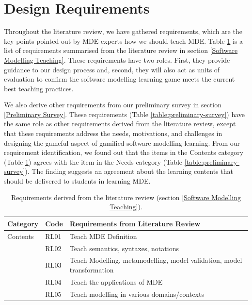 \documentclass[12pt, a4paper]{report}
\begin{document}
{\section{Design Requirements}
Throughout the literature review, we have gathered requirements, which are the key points pointed out by MDE experts how we should teach MDE. Table \ref{table:requirements} is a list of requirements summarised from the literature review in section \ref{Software Modelling Teaching}. These requirements have two roles. First, they provide guidance to our design process and, second, they will also act as units of evaluation to confirm the software modelling learning game meets the current best teaching practices. 
 
We also derive other requirements from our preliminary survey in section \ref{Preliminary Survey}. These requirements (Table \ref{table:preliminary-survey}) have the same role as other requirements derived from the literature review, except that these requirements address the needs, motivations, and challenges in designing the gameful aspect of gamified software modelling learning. From our requirement identification, we found out that the items in the Contents category (Table \ref{table:requirements}) agrees with the item in the Needs category (Table \ref{table:preliminary-survey}). The finding suggests an agreement about the learning contents that should be delivered to students in learning MDE.

\begin{table}[ht]\caption{Requirements derived from the literature review (section \ref{Software Modelling Teaching}).}
\label{table:requirements}
\begin{center}
\begin{tabular}{ p{2cm}p{1cm}p{10cm} } 
\hline
Category & Code & Requirements from Literature Review \\
\hline
\multirow{1}{2cm}{Contents} 
& RL01 & Teach MDE Definition \\ 
& RL02 & Teach semantics, syntaxes, notations \\ 
& RL03 & Teach Modelling, metamodelling, model validation, model transformation\\
& RL04 & Teach the applications of MDE \\
& RL05 & Teach modelling in various domains/contexts \\


\end{tabular}
\end{center}
\end{table}}
\end{document}

